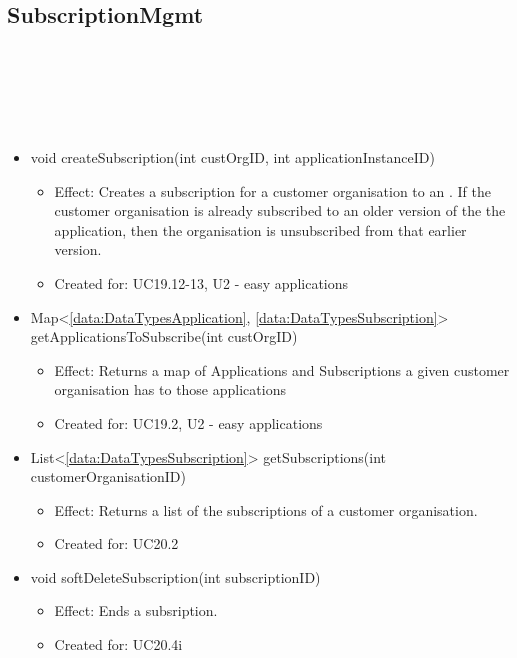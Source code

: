   \subsection{SubscriptionMgmt}\label{int:OnlineServiceOnlineServiceSubscriptionManagerSubscriptionMgmt}
    \begin{description}
      \item[Provided by:] \iconcomponent{}~
      \item[Required by:] \iconcomponent{}~
      \item[Operations:] ~
    \begin{itemize}[noitemsep,nolistsep,leftmargin=-.25cm]
      \item \textsf{void createSubscription(int custOrgID, int applicationInstanceID)}
        \begin{itemize}[noitemsep,nolistsep]
           \item Effect: Creates a subscription for a customer organisation to an . If the customer organisation is already subscribed to an older version of the the application, then the organisation is unsubscribed from that earlier version.
\item Created for: UC19.12-13, U2 - easy applications
        \end{itemize}
      \item \textsf{Map\textless{}\ref{data:DataTypesApplication}, \ref{data:DataTypesSubscription}\textgreater{} getApplicationsToSubscribe(int custOrgID)}
        \begin{itemize}[noitemsep,nolistsep]
           \item Effect: Returns a map of Applications and Subscriptions a given customer organisation has to those applications
\item Created for: UC19.2, U2 - easy applications
        \end{itemize}
      \item \textsf{List\textless{}\ref{data:DataTypesSubscription}\textgreater{} getSubscriptions(int customerOrganisationID)}
        \begin{itemize}[noitemsep,nolistsep]
           \item Effect: Returns a list of the subscriptions of a customer organisation.
\item Created for: UC20.2
        \end{itemize}
      \item \textsf{void softDeleteSubscription(int subscriptionID)}
        \begin{itemize}[noitemsep,nolistsep]
           \item Effect: Ends a subsription.
\item Created for: UC20.4i
        \end{itemize}
    \end{itemize}
    \end{description}

